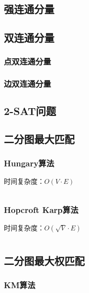 \documentclass[a4paper]{article}
\newcommand{\cppcode}[1]{
    \inputminted[mathescape]{cpp}{source/#1}
}
\begin{document}
\subsection{强连通分量}


\subsection{双连通分量}

\subsubsection{点双连通分量}

\subsubsection{边双连通分量}

\subsection{2-SAT问题}


\subsection{二分图最大匹配}

\subsubsection{Hungary算法}

时间复杂度：$O(V \cdot E)$

\cppcode{graph-theory/maximum-matching-hungary.cpp}

\subsubsection{Hopcroft Karp算法}

时间复杂度：$O(\sqrt{V} \cdot E)$

\cppcode{graph-theory/maximum-matching-hopcroft-karp.cpp}

\subsection{二分图最大权匹配}

\subsubsection{KM算法}
\end{document}
